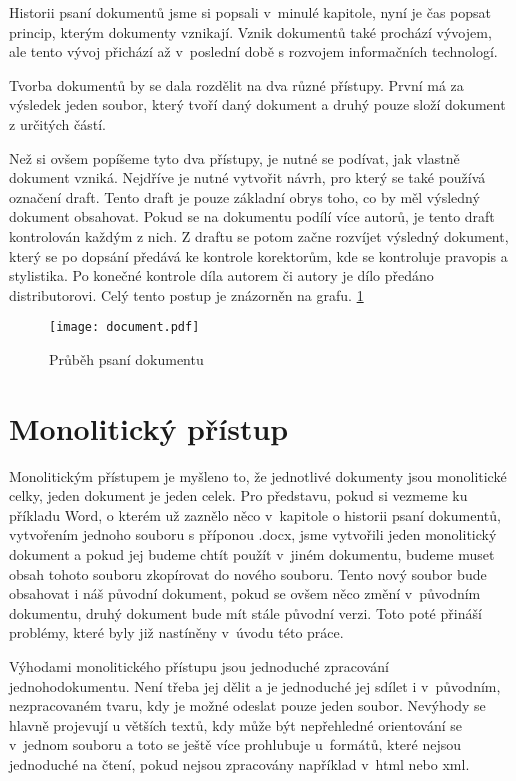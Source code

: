 Historii psaní dokumentů jsme si popsali v~minulé kapitole, nyní je čas popsat princip, kterým dokumenty vznikají. Vznik dokumentů také prochází
vývojem, ale tento vývoj přichází až v~poslední době s rozvojem informačních technologí.

Tvorba dokumentů by se dala rozdělit na dva různé přístupy.
První má za výsledek jeden soubor, který tvoří daný dokument a druhý pouze složí dokument z určitých částí.

Než si ovšem popíšeme tyto dva přístupy, je nutné se podívat, jak vlastně dokument vzniká. Nejdříve je nutné vytvořit návrh, pro který se také používá
označení draft. Tento draft je pouze základní obrys toho, co by měl výsledný dokument obsahovat. Pokud se na dokumentu podílí více autorů, je
tento draft kontrolován každým z nich. Z draftu se potom začne rozvíjet výsledný dokument, který se po dopsání předává ke kontrole korektorům,
kde se \mbox{kontroluje} pravopis a stylistika. Po konečné kontrole díla autorem či autory je dílo předá\-no distributorovi. Celý tento postup
je znázorněn na grafu. \ref{fig:linflow}

\begin{figure}[h]
    \centering
    \texttt{[image: document.pdf]}
    \caption{Průběh psaní dokumentu}
    \label{fig:linflow}
\end{figure}

\section{Monolitický přístup}

Monolitickým přístupem je myšleno to, že jednotlivé dokumenty jsou monolitické celky, jeden dokument je jeden celek. Pro představu, pokud si vezmeme ku příkladu
Word, o kterém už zaznělo něco v~kapitole o historii psaní dokumentů, vytvořením jednoho souboru s příponou .docx, jsme vytvořili jeden monolitický dokument a pokud jej
budeme chtít použít v~jiném dokumentu, budeme muset obsah tohoto souboru zkopírovat do nového souboru. Tento nový soubor bude obsahovat i náš původní dokument,
pokud se ovšem něco změní v~původním dokumentu, druhý dokument bude mít stále původní verzi. Toto poté přináší problémy, které byly již nastíněny v~úvodu této práce.

Výhodami monolitického přístupu jsou jednoduché zpracování jednoho\linebreak dokumentu. Není třeba jej dělit a je jednoduché jej sdílet i v~původním, nezpracovaném tvaru, kdy je
možné odeslat pouze jeden soubor. Nevýhody se hlavně projevují u větších textů, kdy může být nepřehledné orientování se v~jednom souboru a toto se ještě více
prohlubuje u~formátů, které nejsou jednoduché na čtení, pokud nejsou zpracovány například v~\gls{html} nebo \gls{xml}.

